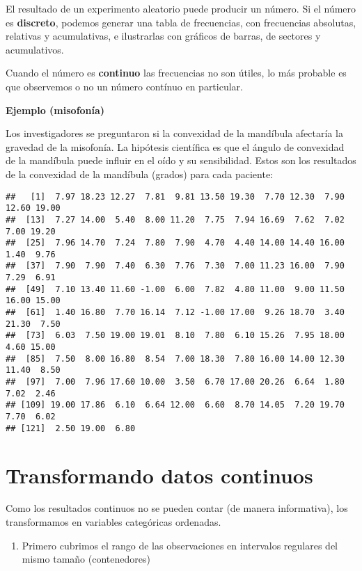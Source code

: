 \documentclass[
]{book}
\providecommand{\tightlist}{%
  \setlength{\itemsep}{0pt}\setlength{\parskip}{0pt}}
\begin{document}
El resultado de un experimento aleatorio puede producir un número. Si el número es \textbf{discreto}, podemos generar una tabla de frecuencias, con frecuencias absolutas, relativas y acumulativas, e ilustrarlas con gráficos de barras, de sectores y acumulativos.

Cuando el número es \textbf{continuo} las frecuencias no son útiles, lo más probable es que observemos o no un número contínuo en particular.

\textbf{Ejemplo (misofonía)}

Los investigadores se preguntaron si la convexidad de la mandíbula afectaría la gravedad de la misofonía. La hipótesis científica es que el ángulo de convexidad de la mandíbula puede influir en el oído y su sensibilidad. Estos son los resultados de la convexidad de la mandíbula (grados) para cada paciente:

\begin{verbatim}
##   [1]  7.97 18.23 12.27  7.81  9.81 13.50 19.30  7.70 12.30  7.90 12.60 19.00
##  [13]  7.27 14.00  5.40  8.00 11.20  7.75  7.94 16.69  7.62  7.02  7.00 19.20
##  [25]  7.96 14.70  7.24  7.80  7.90  4.70  4.40 14.00 14.40 16.00  1.40  9.76
##  [37]  7.90  7.90  7.40  6.30  7.76  7.30  7.00 11.23 16.00  7.90  7.29  6.91
##  [49]  7.10 13.40 11.60 -1.00  6.00  7.82  4.80 11.00  9.00 11.50 16.00 15.00
##  [61]  1.40 16.80  7.70 16.14  7.12 -1.00 17.00  9.26 18.70  3.40 21.30  7.50
##  [73]  6.03  7.50 19.00 19.01  8.10  7.80  6.10 15.26  7.95 18.00  4.60 15.00
##  [85]  7.50  8.00 16.80  8.54  7.00 18.30  7.80 16.00 14.00 12.30 11.40  8.50
##  [97]  7.00  7.96 17.60 10.00  3.50  6.70 17.00 20.26  6.64  1.80  7.02  2.46
## [109] 19.00 17.86  6.10  6.64 12.00  6.60  8.70 14.05  7.20 19.70  7.70  6.02
## [121]  2.50 19.00  6.80
\end{verbatim}

\hypertarget{transformando-datos-continuos}{%
\section{Transformando datos continuos}\label{transformando-datos-continuos}}

Como los resultados continuos no se pueden contar (de manera informativa), los transformamos en variables categóricas ordenadas.

\begin{enumerate}
\def\labelenumi{\arabic{enumi})}
\tightlist
\item
  Primero cubrimos el rango de las observaciones en intervalos regulares del mismo tamaño (contenedores)
\end{enumerate}
\end{document}
